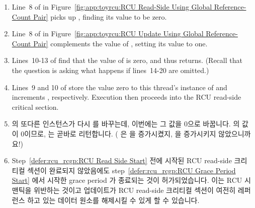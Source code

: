 {\begin{enumerate}
	\item	Line~8 of  in
		Figure~\ref{fig:app:toyrcu:RCU Read-Side Using Global Reference-Count Pair}
		picks up , finding its value to be zero.
	\item	Line~8 of  in
		Figure~\ref{fig:app:toyrcu:RCU Update Using Global Reference-Count Pair}
		complements the value of , setting its
		value to one.
	\item	Lines~10-13 of  find that the
		value of  is zero, and thus
		returns.
		(Recall that the question is asking what happens if
		lines~14-20 are omitted.)
	\item	Lines~9 and 10 of  store the
		value zero to this thread's instance of 
		and increments , respectively.
		Execution then proceeds into the RCU read-side critical
		section.
		\label{sec:app:toyrcu:rcu_rcgp:RCU Read Side Start}
	\fi
	\item	{} 의 또다른 인스턴스가 다시 
		를 바꾸는데, 이번에는 그 값을 0으로 바꿉니다.
		 의 값이 0이므로,  는
		곧바로 리턴합니다.
		( 은  을 증가시켰지,
		 을 증가시키지 않았으니까요!)
		\label{defer:rcu_rcgp:RCU Grace Period Start}
	\item	Step~\ref{defer:rcu_rcgp:RCU Read Side Start} 전에 시작된 RCU
		read-side 크리티컬 섹션이 완료되지 않았음에도
		step~\ref{defer:rcu_rcgp:RCU Grace Period Start} 에서 시작한
		grace period 가 종료되는 것이 허가되었습니다.
		이는 RCU 시맨틱을 위반하는 것이고 업데이트가 RCU read-side
		크리티컬 섹션이 여전히 레퍼런스 하고 있는 데이터 원소를
		해제시킬 수 있게 할 수 있습니다.
	\iffalse

	\item	Another instance of \co{synchronize_rcu()} again complements
		\co{rcu_idx}, this time setting its value to zero.
		Because \co{rcu_refcnt[1]} is zero, \co{synchronize_rcu()}
		returns immediately.
		(Recall that \co{rcu_read_lock()} incremented
		\co{rcu_refcnt[0]}, not \co{rcu_refcnt[1]}!)
		\label{sec:app:toyrcu:rcu_rcgp:RCU Grace Period Start}
	\item	The grace period that started in
		step~\ref{sec:app:toyrcu:rcu_rcgp:RCU Grace Period Start}
		has been allowed to end, despite
		the fact that the RCU read-side critical section
		that started beforehand in
		step~\ref{sec:app:toyrcu:rcu_rcgp:RCU Read Side Start}
		has not completed.
		This violates RCU semantics, and could allow the update
		to free a data element that the RCU read-side critical
		section was still referencing.
	\fi
	\end{enumerate}

}

